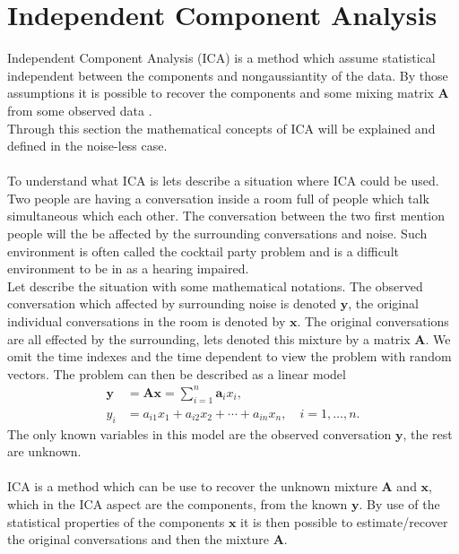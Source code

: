 \section{Independent Component Analysis}\label{sec:ICA}

Independent Component Analysis (ICA) is a method which assume statistical independent between the components and nongaussiantity of the data. By those assumptions it is possible to recover the components and some mixing matrix $\mathbf{A}$ from some observed data \cite[p. 3]{ICA}. 
\\
Through this section the mathematical concepts of ICA will be explained and defined in the noise-less case.
\\ \\
To understand what ICA is lets describe a situation where ICA could be used. Two people are having a conversation inside a room full of people which talk simultaneous which each other. The conversation between the two first mention people will the be affected by the surrounding conversations and noise. Such environment is often called the cocktail party problem and is a difficult environment to be in as a hearing impaired.
\\
Let describe the situation with some mathematical notations. The observed conversation which affected by surrounding noise is denoted $\mathbf{y}$, the original individual conversations in the room is denoted by $\mathbf{x}$. The original conversations are all effected by the surrounding, lets denoted this mixture by a matrix $\mathbf{A}$. We omit the time indexes and the time dependent to view the problem with random vectors. The problem can then be described as a linear model
\begin{align}
\mathbf{y} &= \mathbf{Ax} = \sum_{i=1}^n \mathbf{a}_i x_i,  \label{eq:ICA_1} \\
y_i &= a_{i1} x_1 + a_{i2} x_2 + \cdots + a_{in} x_n, \quad i = 1, \dots, n. \label{eq:ICA_2}
\end{align}
The only known variables in this model are the observed conversation $\mathbf{y}$, the rest are unknown. 
\\ \\
ICA is a method which can be use to recover the unknown mixture $\mathbf{A}$ and $\mathbf{x}$, which in the ICA aspect are the components, from the known $\mathbf{y}$. By use of the statistical properties of the components $\mathbf{x}$ it is then possible to estimate/recover the original conversations and then the mixture $\mathbf{A}$.
